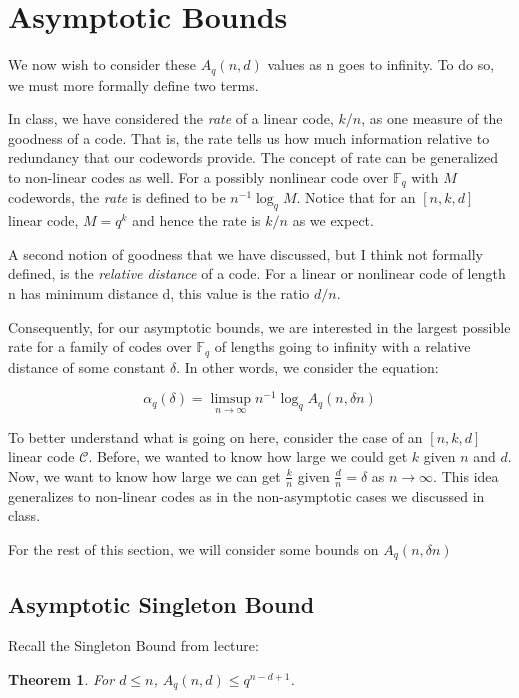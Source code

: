 \documentclass{article}
\newtheorem{theorem}{Theorem}
\numberwithin{theorem}{subsection}
\numberwithin{lemma}{subsection}
\theoremstyle{definition}
\numberwithin{exmp}{subsection}
\theoremstyle{definition}
\numberwithin{defn}{subsection}
\theoremstyle{definition}
\numberwithin{claim}{subsection}
\begin{document}
\section{Asymptotic Bounds}
We now wish to consider these $A_q(n,d)$ values as n goes to infinity.  To do so, we must more formally define two terms.

In class, we have considered the \textit{rate} of a linear code, $k/n$, as one measure of the goodness of a code.  That is,
the rate tells us how much information relative to redundancy that our codewords provide.  The concept of rate can be generalized
to non-linear codes as well.  For a possibly nonlinear code over $\mathbb{F}_q$ with $M$ codewords, the \textit{rate} is defined to be $n^{-1} \log_q {M}$.  Notice that
for an $[n,k,d]$ linear code, $M = q^k$ and hence the rate is $k/n$ as we expect.

A second notion of goodness that we have discussed, but I think not formally defined, is the \textit{relative distance} of a code.  For a linear or nonlinear code of length n
has minimum distance d, this value is the ratio $d/n$. 

Consequently, for our asymptotic bounds, we are interested in the largest
possible rate for a family of codes over $\mathbb{F}_q$ of lengths going to
infinity with a relative distance of some constant $\delta$.  In other words, we consider the equation:

\begin{equation}
\alpha_{q}(\delta) = \limsup_{n \to \infty} n^{-1} \log_q A_q(n,\delta n)
\end{equation}

To better understand what is going on here, consider the case of an $[n,k,d]$ linear code $\mathcal{C}$.  Before, we wanted to know how large we could get $k$ given
$n$ and $d$.  Now, we want to know how large we can get $\frac{k}{n}$ given $\frac{d}{n}=\delta$ as $n\to\infty$.  This idea generalizes to non-linear codes as 
in the non-asymptotic cases we discussed in class.

For the rest of this section, we will consider some bounds on $A_q(n,\delta n)$

\subsection{Asymptotic Singleton Bound}

Recall the Singleton Bound from lecture:

\begin{theorem}
For $d \le n$, $A_q(n,d) \le q^{n-d+1}$.
\end{theorem}
\end{document}
